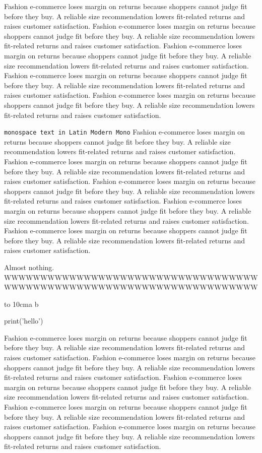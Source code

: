 \documentclass[a4paper,11pt]{article}
\begin{document}
Fashion e-commerce loses margin on returns because shoppers cannot judge fit before they buy. A reliable size recommendation lowers fit-related returns and raises customer satisfaction. Fashion e-commerce loses margin on returns because shoppers cannot judge fit before they buy. A reliable size recommendation lowers fit-related returns and raises customer satisfaction. Fashion e-commerce loses margin on returns because shoppers cannot judge fit before they buy. A reliable size recommendation lowers fit-related returns and raises customer satisfaction. Fashion e-commerce loses margin on returns because shoppers cannot judge fit before they buy. A reliable size recommendation lowers fit-related returns and raises customer satisfaction. Fashion e-commerce loses margin on returns because shoppers cannot judge fit before they buy. A reliable size recommendation lowers fit-related returns and raises customer satisfaction. \par\texttt{monospace text in Latin Modern Mono}\newpage
Fashion e-commerce loses margin on returns because shoppers cannot judge fit before they buy. A reliable size recommendation lowers fit-related returns and raises customer satisfaction. Fashion e-commerce loses margin on returns because shoppers cannot judge fit before they buy. A reliable size recommendation lowers fit-related returns and raises customer satisfaction. Fashion e-commerce loses margin on returns because shoppers cannot judge fit before they buy. A reliable size recommendation lowers fit-related returns and raises customer satisfaction. Fashion e-commerce loses margin on returns because shoppers cannot judge fit before they buy. A reliable size recommendation lowers fit-related returns and raises customer satisfaction. Fashion e-commerce loses margin on returns because shoppers cannot judge fit before they buy. A reliable size recommendation lowers fit-related returns and raises customer satisfaction. \par\vspace*{\fill}{\headfont\Huge Orphan Heading}\par\newpage
Almost nothing.\newpage
\noindent\mbox{WWWWWWWWWWWWWWWWWWWWWWWWWWWWWWWWWWWWWWWWWWWWWWWWWWWWWWWWWWWWWWWWWWWWWW}\par\noindent\hbox to 10cm{a b}\par
\newpage
{\codefont print('hello')}\par Fashion e-commerce loses margin on returns because shoppers cannot judge fit before they buy. A reliable size recommendation lowers fit-related returns and raises customer satisfaction. Fashion e-commerce loses margin on returns because shoppers cannot judge fit before they buy. A reliable size recommendation lowers fit-related returns and raises customer satisfaction. Fashion e-commerce loses margin on returns because shoppers cannot judge fit before they buy. A reliable size recommendation lowers fit-related returns and raises customer satisfaction. Fashion e-commerce loses margin on returns because shoppers cannot judge fit before they buy. A reliable size recommendation lowers fit-related returns and raises customer satisfaction. Fashion e-commerce loses margin on returns because shoppers cannot judge fit before they buy. A reliable size recommendation lowers fit-related returns and raises customer satisfaction. 
\end{document}
